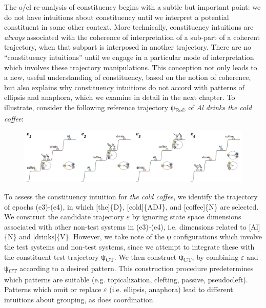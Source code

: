 \ea
  \z
\z

  The o/el re-analysis of constituency begins with a subtle but important point: we do not have intuitions about constituency until we interpret a potential constituent in some other context. More technically, constituency intuitions are \textit{always} associated with the coherence of interpretation of a sub-part of a coherent trajectory, when that subpart is interposed in another trajectory. There are no “constituency intuitions” until we engage in a particular mode of interpretation which involves these trajectory manipulations. This conception not only leads to a new, useful understanding of constituency, based on the notion of coherence, but also explains why constituency intuitions do not accord with patterns of ellipsis and anaphora, which we examine in detail in the next chapter. To illustrate, consider the following reference trajectory ψ\textsubscript{Ref}, of \textit{Al drinks the cold coffee}:

  
\begin{figure}
\includegraphics[width=\textwidth]{figures/Tilsen-img137.png}
\caption{\missingcaption}
\label{fig:6:18}
\end{figure}
  

  To assess the constituency intuition for \textit{the cold coffee}, we identify the trajectory of epochs (e3)-(e4), in which [the]\{D\}, [cold]\{ADJ\}, and [coffee]\{N\} are selected. We construct the candidate trajectory $\varepsilon $ by ignoring state space dimensions associated with other non-test systems in (e3)-(e4), i.e. dimensions related to [Al]\{N\} and [drinks]\{V\}. However, we take note of the φ configurations which involve the test systems and non-test systems, since we attempt to integrate these with the constituent test trajectory ψ\textsubscript{CT}. We then construct ψ\textsubscript{CT}, by combining $\varepsilon $ and ψ\textsubscript{CT} according to a desired pattern. This construction procedure predetermines which patterns are suitable (e.g. topicalization, clefting, passive, pseudocleft). Patterns which omit or replace $\varepsilon $ (i.e. ellipsis, anaphora) lead to different intuitions about grouping, as does coordination.

